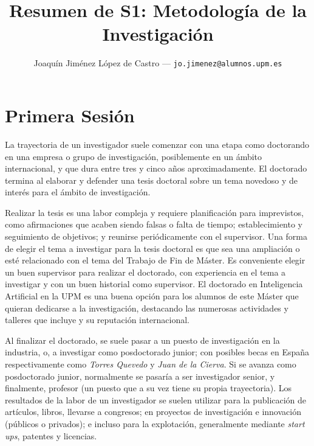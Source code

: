 \documentclass{article}
\title{Resumen de S1: Metodología de la Investigación} %
\author{Joaquín Jiménez López de Castro --- \texttt{jo.jimenez@alumnos.upm.es}} %
\begin{document}
\onlytitle


\section{Primera Sesión}

La trayectoria de un investigador suele comenzar con una etapa como doctorando en una empresa o grupo de investigación, posiblemente en un ámbito internacional, y que dura entre tres y cinco años aproximadamente. El doctorado termina al elaborar y defender una tesis doctoral sobre un tema novedoso y de interés para el ámbito de investigación.

Realizar la tesis es una labor compleja y requiere planificación para imprevistos, como afirmaciones que acaben siendo falsas o falta de tiempo; establecimiento y seguimiento de objetivos; y reunirse periódicamente con el supervisor. Una forma de elegir el tema a investigar para la tesis doctoral es que sea una ampliación o esté relacionado con el tema del Trabajo de Fin de Máster. Es conveniente elegir un buen supervisor para realizar el doctorado, con experiencia en el tema a investigar y con un buen historial como supervisor. El doctorado en Inteligencia Artificial en la UPM es una buena opción para los alumnos de este Máster que quieran dedicarse a la investigación, destacando las numerosas actividades y talleres que incluye y su reputación internacional.

Al finalizar el doctorado, se suele pasar a un puesto de investigación en la industria, o, a investigar como posdoctorado junior; con posibles becas en España respectivamente como \emph{Torres Quevedo} y \emph{Juan de la Cierva}. Si se avanza como posdoctorado junior, normalmente se pasaría a ser investigador senior, y finalmente, profesor (un puesto que a su vez tiene su propia trayectoria). Los resultados de la labor de un investigador se suelen utilizar para la publicación de artículos, libros, llevarse a congresos; en proyectos de investigación e innovación (públicos o privados); e incluso para la explotación, generalmente mediante \emph{start ups}, patentes y licencias.
\end{document}
